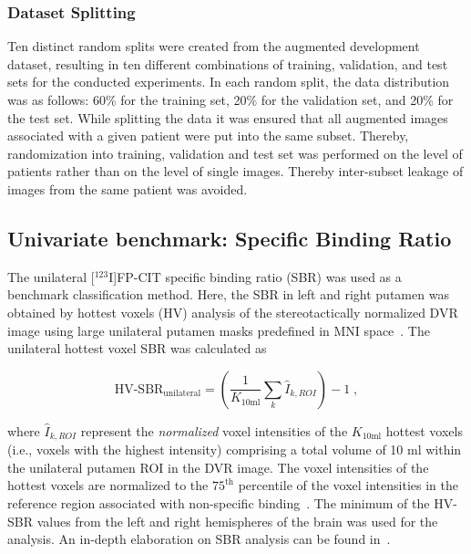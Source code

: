 \subsubsection{Dataset Splitting}
\label{subsec:split}

Ten distinct random splits were created from the augmented development dataset, 
resulting in ten different combinations of training, validation, and test sets for the conducted experiments.
In each random split, the data distribution was as follows: 
60\% for the training set, 20\% for the validation set, and 20\% for the test set.
While splitting the data it was ensured that all augmented images associated with a given patient were put 
into the same subset.
Thereby, randomization into training, validation and test set was performed 
on the level of patients rather than on the level of single images.
Thereby inter-subset leakage of images from the same patient was avoided.

\subsection{Univariate benchmark: Specific Binding Ratio}
\label{subsec:sbr}

The unilateral [$^{123}$I]FP-CIT specific binding ratio (SBR) was used as a benchmark classification method.
Here, the SBR in left and right putamen was obtained by hottest voxels (HV) analysis of the stereotactically normalized 
DVR image using large unilateral putamen masks predefined in MNI space~\citep{Wenzel2019}.
The unilateral hottest voxel SBR was calculated as

\begin{equation}\label{eq:sbr}
  \text{HV-SBR}_{\text{unilateral}} = \left( \frac{1}{K_{\text{10ml}}} \sum_{k} \hat{I}_{k, ROI} \right) - 1 \;,
\end{equation}

where $\hat{I}_{k, ROI}$ represent the \textit{normalized} voxel intensities of the $K_{\text{10ml}}$
hottest voxels (i.e., voxels with the highest intensity) comprising a total volume of 10 ml 
within the unilateral putamen ROI in the DVR image.
The voxel intensities of the hottest voxels are normalized to the $75^{\text{th}}$ percentile of the voxel intensities 
in the reference region associated with non-specific binding~\citep{Wenzel2019}.
The minimum of the HV-SBR values from the left and right hemispheres of the brain was used for the analysis.
An in-depth elaboration on SBR analysis can be found in~\cite{Wenzel2019}.

